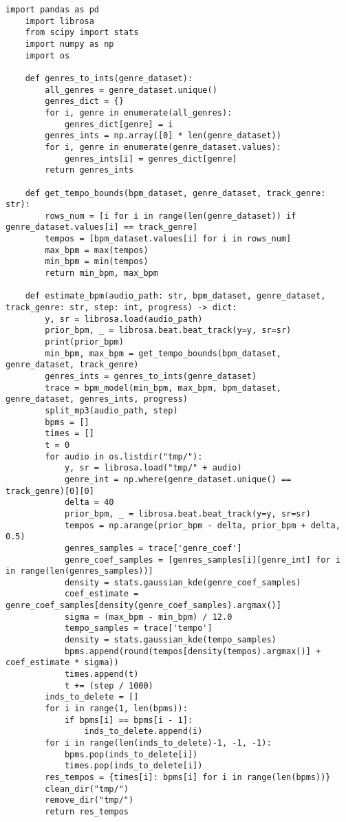 
\begin{lstlisting}[caption={модуль оценки темпа и ритма}]
	import pandas as pd
	import librosa
	from scipy import stats
	import numpy as np
	import os
	
	def genres_to_ints(genre_dataset):
		all_genres = genre_dataset.unique()
		genres_dict = {}
		for i, genre in enumerate(all_genres):
			genres_dict[genre] = i
		genres_ints = np.array([0] * len(genre_dataset))
		for i, genre in enumerate(genre_dataset.values):
			genres_ints[i] = genres_dict[genre]
		return genres_ints
	
	def get_tempo_bounds(bpm_dataset, genre_dataset, track_genre: str):
		rows_num = [i for i in range(len(genre_dataset)) if genre_dataset.values[i] == track_genre]
		tempos = [bpm_dataset.values[i] for i in rows_num]
		max_bpm = max(tempos)
		min_bpm = min(tempos)
		return min_bpm, max_bpm
	
	def estimate_bpm(audio_path: str, bpm_dataset, genre_dataset, track_genre: str, step: int, progress) -> dict:
		y, sr = librosa.load(audio_path)
		prior_bpm, _ = librosa.beat.beat_track(y=y, sr=sr)
		print(prior_bpm)
		min_bpm, max_bpm = get_tempo_bounds(bpm_dataset, genre_dataset, track_genre)
		genres_ints = genres_to_ints(genre_dataset)
		trace = bpm_model(min_bpm, max_bpm, bpm_dataset, genre_dataset, genres_ints, progress)
		split_mp3(audio_path, step)
		bpms = []
		times = []
		t = 0
		for audio in os.listdir("tmp/"):
			y, sr = librosa.load("tmp/" + audio)
			genre_int = np.where(genre_dataset.unique() == track_genre)[0][0]
			delta = 40
			prior_bpm, _ = librosa.beat.beat_track(y=y, sr=sr)
			tempos = np.arange(prior_bpm - delta, prior_bpm + delta, 0.5)
			genres_samples = trace['genre_coef']
			genre_coef_samples = [genres_samples[i][genre_int] for i in range(len(genres_samples))]
			density = stats.gaussian_kde(genre_coef_samples)
			coef_estimate = genre_coef_samples[density(genre_coef_samples).argmax()]
			sigma = (max_bpm - min_bpm) / 12.0
			tempo_samples = trace['tempo']
			density = stats.gaussian_kde(tempo_samples)
			bpms.append(round(tempos[density(tempos).argmax()] + coef_estimate * sigma))
			times.append(t)
			t += (step / 1000)
		inds_to_delete = []
		for i in range(1, len(bpms)):
			if bpms[i] == bpms[i - 1]:
				inds_to_delete.append(i)
		for i in range(len(inds_to_delete)-1, -1, -1):
			bpms.pop(inds_to_delete[i])
			times.pop(inds_to_delete[i])
		res_tempos = {times[i]: bpms[i] for i in range(len(bpms))}
		clean_dir("tmp/")
		remove_dir("tmp/")
		return res_tempos
	

\end{lstlisting}
